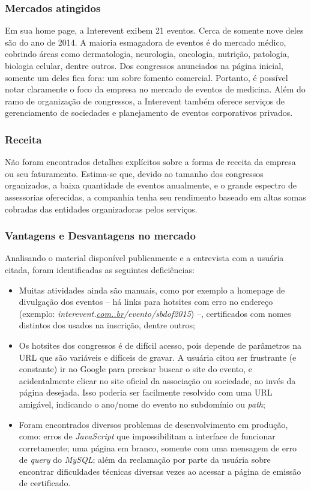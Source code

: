 \documentclass[12pt,a4paper,twoside,hyphens,english,brazil]{abntex2}
\begin{document}
\subsubsection*{Mercados atingidos}
Em sua home page\cite{interevent}, a Interevent exibem 21 eventos. Cerca de somente nove deles são do ano de 2014. A maioria esmagadora de eventos é do mercado médico, cobrindo áreas como dermatologia, neurologia, oncologia, nutrição, patologia, biologia celular, dentre outros. Dos congressos anunciados na página inicial, somente um deles fica fora: um sobre fomento comercial. Portanto, é possível notar claramente o foco da empresa no mercado de eventos de medicina. Além do ramo de organização de congressos, a Interevent também oferece serviços de gerenciamento de sociedades e planejamento de eventos corporativos privados.

\subsubsection*{Receita}
Não foram encontrados detalhes explícitos sobre a forma de receita da empresa ou seu faturamento. Estima-se que, devido ao tamanho dos congressos organizados, a baixa quantidade de eventos anualmente, e o grande espectro de assessorias oferecidas, a companhia tenha seu rendimento baseado em altas somas cobradas das entidades organizadoras pelos serviços.

\subsubsection*{Vantagens e Desvantagens no mercado}
Analisando o material disponível publicamente e a entrevista com a usuária citada, foram identificadas as seguintes deficiências:
\begin{itemize}
	\item Muitas atividades ainda são manuais, como por exemplo a homepage de divulgação dos eventos -- há links para hotsites com erro no endereço (exemplo: \emph{interevent.\underline{com..br}/evento/sbdof2015}) --, certificados com nomes distintos dos usados na inscrição, dentre outros;
	\item Os hotsites dos congressos é de difícil acesso, pois depende de parâmetros na URL que são variáveis e difíceis de gravar. A usuária citou ser frustrante (e constante) ir no Google para precisar buscar o site do evento, e acidentalmente clicar no site oficial da associação ou sociedade, ao invés da página desejada. Isso poderia ser facilmente resolvido com uma URL amigável, indicando o ano/nome do evento no subdomínio ou \emph{path};
	\item Foram encontrados diversos problemas de desenvolvimento em produção, como: erros de \emph{JavaScript} que impossibilitam a interface de funcionar corretamente; uma página em branco, somente com uma mensagem de erro de \emph{query} do \emph{MySQL}; além da reclamação por parte da usuária sobre encontrar dificuldades técnicas diversas vezes ao acessar a página de emissão de certificado.
\end{itemize}
\end{document}

